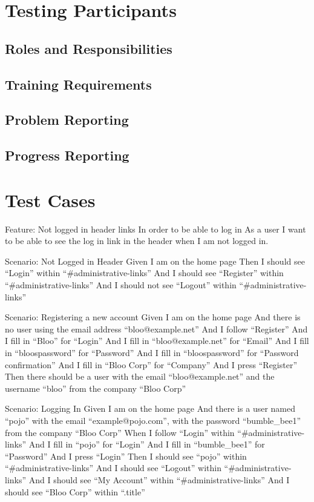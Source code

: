\documentclass[12pt]{article}
\begin{document}
\section{Testing Participants}
\subsection{Roles and Responsibilities}
\subsection{Training Requirements}
\subsection{Problem Reporting}
\subsection{Progress Reporting}

\section{Test Cases}

Feature: Not logged in header links
  In order to be able to log in
  As a user
  I want to be able to see the log in link in the header when I am not logged in.

Scenario: Not Logged in Header
  Given I am on the home page
  Then I should see ``Login'' within ``#administrative-links''
  And I should see ``Register'' within ``#administrative-links''
  And I should not see ``Logout'' within ``#administrative-links''

Scenario: Registering a new account
  Given I am on the home page
  And there is no user using the email address ``bloo@example.net''
  And I follow ``Register''
  And I fill in ``Bloo'' for ``Login''
  And I fill in ``bloo@example.net'' for ``Email''
  And I fill in ``bloospassword'' for ``Password''
  And I fill in ``bloospassword'' for ``Password confirmation''
  And I fill in ``Bloo Corp'' for ``Company''
  And I press ``Register''
  Then there should be a user with the email ``bloo@example.net'' and the username ``bloo'' from the company ``Bloo Corp''

Scenario: Logging In
  Given I am on the home page
  And there is a user named ``pojo'' with the email ``example@pojo.com'', with the password ``bumble_bee1'' from the company ``Bloo Corp''
  When I follow ``Login'' within ``#administrative-links''
  And I fill in ``pojo'' for ``Login''
  And I fill in ``bumble_bee1'' for ``Password''
  And I press ``Login''
  Then I should see ``pojo'' within ``#administrative-links''
  And I should see ``Logout'' within ``#administrative-links''
  And I should see ``My Account'' within ``#administrative-links''
  And I should see ``Bloo Corp'' within ``.title''
\end{document}
